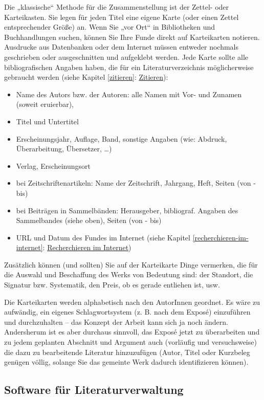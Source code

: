 \documentclass[]{book}
\providecommand{\tightlist}{%
  \setlength{\itemsep}{0pt}\setlength{\parskip}{0pt}}
\theoremstyle{definition}
\theoremstyle{definition}
\theoremstyle{definition}
\theoremstyle{remark}
\begin{document}
Die „klassische`` Methode für die Zusammenstellung ist der Zettel- oder
Karteikasten. Sie legen für jeden Titel eine eigene Karte (oder einen
Zettel entsprechender Größe) an. Wenn Sie „vor Ort`` in Bibliotheken und
Buchhandlungen suchen, können Sie Ihre Funde direkt auf Karteikarten
notieren. Ausdrucke aus Datenbanken oder dem Internet müssen entweder
nochmals geschrieben oder ausgeschnitten und aufgeklebt werden. Jede
Karte sollte alle bibliografischen Angaben haben, die für ein
Literaturverzeichnis möglicherweise gebraucht werden (siehe Kapitel
\ref{zitieren}: \protect\hyperlink{zitieren}{Zitieren}):

\begin{itemize}
\tightlist
\item
  Name des Autors bzw. der Autoren: alle Namen mit Vor- und Zunamen
  (soweit eruierbar),
\item
  Titel und Untertitel
\item
  Erscheinungsjahr, Auflage, Band, sonstige Angaben (wie: Abdruck,
  Überarbeitung, Übersetzer, \ldots{})
\item
  Verlag, Erscheinungsort
\item
  bei Zeitschriftenartikeln: Name der Zeitschrift, Jahrgang, Heft,
  Seiten (von - bis)
\item
  bei Beiträgen in Sammelbänden: Herausgeber, bibliograf. Angaben des
  Sammelbandes (siehe oben), Seiten (von - bis)
\item
  URL und Datum des Fundes im Internet (siehe Kapitel
  \ref{recherchieren-im-internet}:
  \protect\hyperlink{recherchieren-im-internet}{Recherchieren im
  Internet})
\end{itemize}

Zusätzlich können (und sollten) Sie auf der Karteikarte Dinge vermerken,
die für die Auswahl und Beschaffung des Werks von Bedeutung sind: der
Standort, die Signatur bzw. Systematik, den Preis, ob es gerade
entliehen ist, usw.

Die Karteikarten werden alphabetisch nach den AutorInnen geordnet. Es
wäre zu aufwändig, ein eigenes Schlagwortsystem (z. B. nach dem Exposé)
einzuführen und durchzuhalten -- das Konzept der Arbeit kann sich ja
noch ändern. Andersherum ist es aber durchaus sinnvoll, das Exposé jetzt
zu überarbeiten und zu jedem geplanten Abschnitt und Argument auch
(vorläufig und versuchsweise) die dazu zu bearbeitende Literatur
hinzuzufügen (Autor, Titel oder Kurzbeleg genügen völlig, solange Sie
das gemeinte Werk dadurch identifizieren können).

\subsection{Software für
Literaturverwaltung}\label{software-fur-literaturverwaltung}
\end{document}

